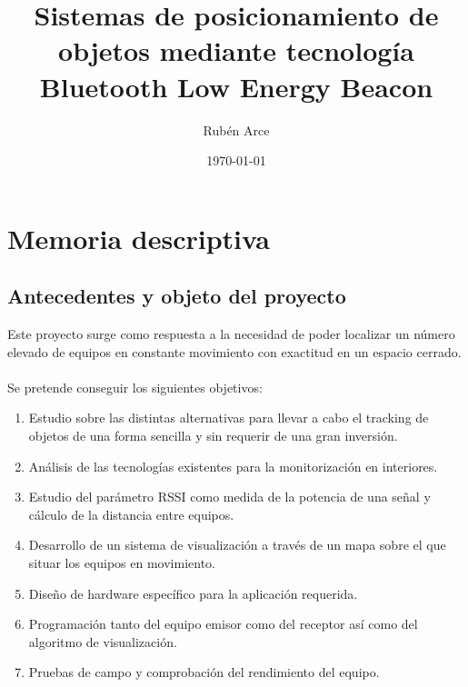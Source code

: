 \documentclass[a4paper ,12pt, onecolumn]{article}
\begin{document}
\pagestyle{fancy}
\title{Sistemas de posicionamiento de objetos mediante tecnología Bluetooth Low Energy Beacon }
\author{Rubén Arce}
\date{\today}
\maketitle
\cleardoublepage
\tableofcontents
\listoffigures
\listoftables
\cleardoublepage


\section{Memoria descriptiva}
    \subsection{Antecedentes y objeto del proyecto}
        Este proyecto surge como respuesta a la necesidad de poder localizar un número elevado de equipos en 
        constante movimiento con exactitud en un espacio cerrado.
        \paragraph{}
        Se pretende conseguir los siguientes objetivos:
        \begin{enumerate}
            \item Estudio sobre las distintas alternativas para llevar a cabo el tracking de objetos de una forma
            sencilla y sin requerir de una gran inversión.
            \item Análisis de las tecnologías existentes para la monitorización en interiores.
            \item Estudio del parámetro RSSI como medida de la potencia de una señal y cálculo de la distancia entre equipos.
            \item Desarrollo de un sistema de visualización a través de un mapa sobre el que situar los equipos en movimiento.
            \item Diseño de hardware específico para la aplicación requerida.
            \item Programación tanto del equipo emisor como del receptor así como del algoritmo de visualización.
            \item Pruebas de campo y comprobación del rendimiento del equipo.
        \end{enumerate}
\end{document}
